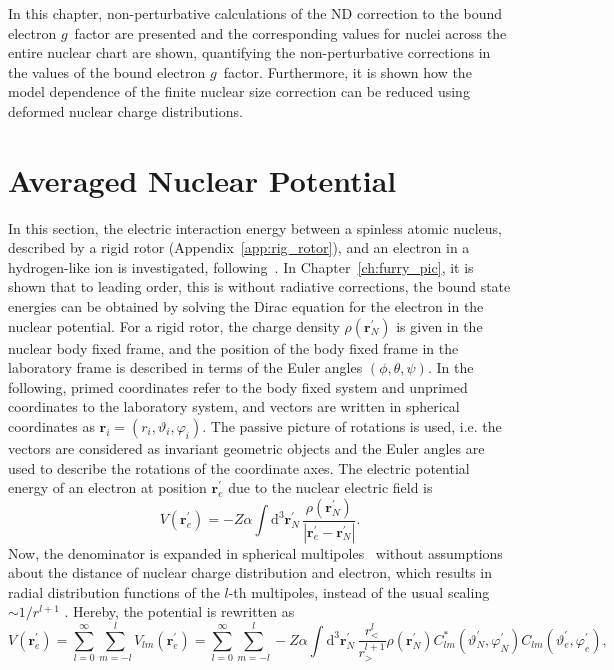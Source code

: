 In this chapter, non-perturbative calculations of the ND correction to the bound electron $g$~factor are presented and the corresponding values for nuclei across the entire nuclear chart are shown, quantifying the non-perturbative corrections in the values of the bound electron $g$~factor. Furthermore, it is shown how the model dependence of the finite nuclear size correction can be reduced using deformed nuclear charge distributions.

\section{Averaged Nuclear Potential}
In this section, the electric interaction energy between a spinless atomic nucleus, described by a rigid rotor (Appendix~\ref{app:rig_rotor}), and an electron in a hydrogen-like ion is investigated, following~\cite{kozhedub2008,jacek2012}. In Chapter~\ref{ch:furry_pic}, it is shown that to leading order, this is without radiative corrections, the bound state energies can be obtained by solving the Dirac equation for the electron in the nuclear potential. For a rigid rotor, the charge density $\rho(\mathbf{r}^{\prime}_N)$ is given in the nuclear body fixed frame, and the position of the body fixed frame in the laboratory frame is described in terms of the Euler angles $(\phi,\theta,\psi)$. In the following, primed coordinates refer to the body fixed system and unprimed coordinates to the laboratory system, and vectors are written in spherical coordinates as $\mathbf{r}_i=(r_i,\vartheta_i,\varphi_i)$. The passive picture of rotations is used, i.e. the vectors are considered as invariant geometric objects and the Euler angles are used to describe the rotations of the coordinate axes. The electric potential energy of an electron at position $\mathbf{r}_{e}^\prime$ due to the nuclear electric field is
\begin{equation}
V(\mathbf{r}_e^\prime)=-Z\alpha \int\mathrm{d}^3\mathbf{r}_N^\prime\,
\frac{\rho(\mathbf{r}_N^\prime)}{\left|\mathbf{r}_e^\prime - \mathbf{r}_N^\prime\right|}.
\end{equation}
Now, the denominator is expanded in spherical multipoles~\cite{jackson1999} without assumptions about the distance of nuclear charge distribution and electron, which results in radial distribution functions of the $l$-th multipoles, instead of the usual scaling $\sim 1/r^{l+1}$ . Hereby, the potential is rewritten as
\begin{equation}
V(\mathbf{r}_e^\prime)=\sum_{l=0}^\infty \sum_{m=-l}^l V_{lm}(\mathbf{r}_e^\prime)= \sum_{l=0}^\infty \sum_{m=-l}^l
-Z\alpha\int\mathrm{d}^3\mathbf{r}_N^{\prime}\,\frac{r_<^l}{r_>^{l+1}}\rho(\mathbf{r}_N^\prime) C_{lm}^*(\vartheta^\prime_N,\varphi_N^\prime) C_{lm}(\vartheta^\prime_e,\varphi_e^\prime),
\label{eq:mulitipoles_1}
\end{equation}
